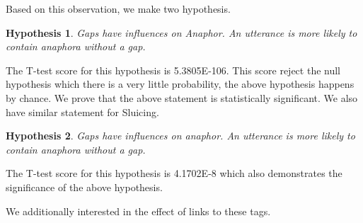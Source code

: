 \documentclass[bsc,frontabs,twoside,singlespacing,parskip,deptreport]{infthesis}     %
\newtheorem*{hypo}{Hypothesis}
\begin{document}
Based on this observation, we make two hypothesis.

\begin{hypo}
Gaps have influences on Anaphor. An utterance is more likely to contain anaphora without a gap. 
\end{hypo}

The T-test score for this hypothesis is 5.3805E-106. This score reject the null hypothesis which there is a very little probability, the above hypothesis happens by chance. We prove that the above statement is statistically significant. We also have similar statement for Sluicing.

\begin{hypo}
Gaps have influences on anaphor. An utterance is more likely to contain anaphora without a gap. 
\end{hypo}

The T-test score for this hypothesis is 4.1702E-8 which also demonstrates the significance of the above hypothesis.

We additionally interested in the effect of links to these tags. 
\end{document}
